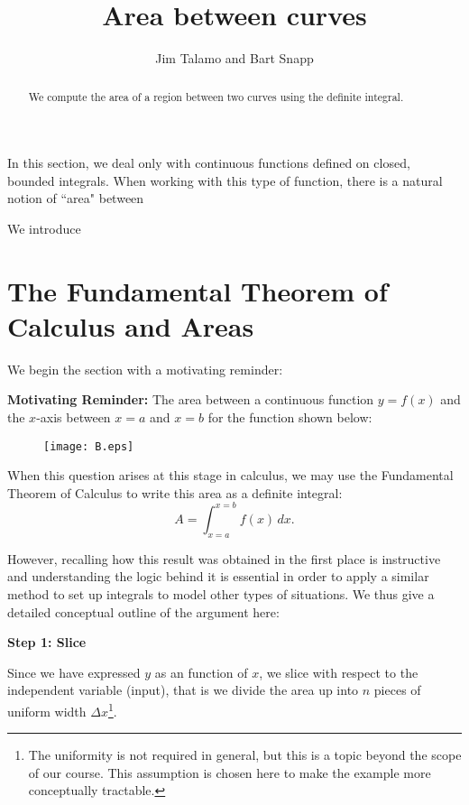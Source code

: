 \documentclass{ximera}
\author{Jim Talamo and Bart Snapp}
\title[Dig-In:]{Area between curves}
\begin{document}
\begin{abstract}
  We compute the area of a region between two curves using the
  definite integral.
\end{abstract}
\maketitle


\vspace{3mm}

In this section, we deal only with continuous functions defined on closed, bounded integrals.  When working with this type of function, there is a natural notion of ``area" between

We introduce


\section{The Fundamental Theorem of Calculus and Areas}

We begin the section with a motivating reminder:

\textbf{Motivating Reminder:} The area between a continuous function $y=f(x)$ and the $x$-axis between $x=a$ and $x=b$ for the function shown below:

\begin{figure}[h!]
  \centering 
  \texttt{[image: B.eps]}
\end{figure}

\vspace{3mm}
When this question arises at this stage in calculus, we may use the Fundamental Theorem of Calculus to write this area as a definite integral: $$\displaystyle A = \int_{x=a}^{x=b} f(x) \, dx .$$

However, recalling how this result was obtained in the first place is instructive and understanding the logic behind it is essential in order to apply a similar method to set up integrals to model other types of situations.  We thus give a detailed conceptual outline of the argument here:

\vspace{3mm}
\textbf{Step 1: Slice}

Since we have expressed $y$ as an function of $x$, we slice with respect to the independent variable (input), that is we divide the area up into $n$ pieces of uniform width $\Delta x$\footnote{The uniformity is not required in general, but this is a topic beyond the scope of our course.  This assumption is chosen here to make the example more conceptually tractable.}.
\end{document}
